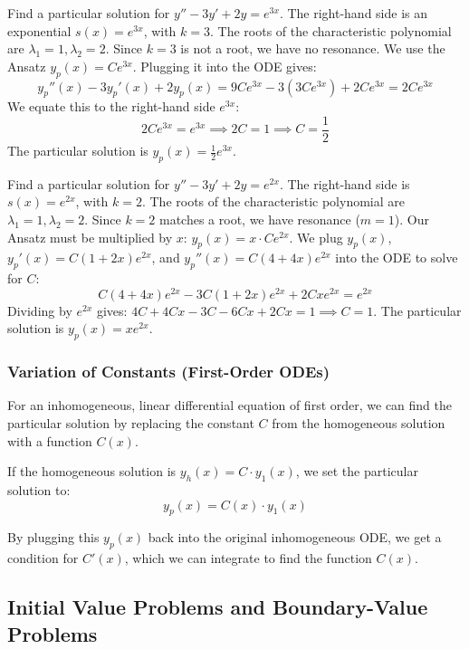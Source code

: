 \begin{example}
    Find a particular solution for $y'' - 3y' + 2y = e^{3x}$.
    The right-hand side is an exponential $s(x) = e^{3x}$, with $k=3$.
    The roots of the characteristic polynomial are $\lambda_1=1, \lambda_2=2$. Since $k=3$ is not a root, we have no resonance.
    We use the Ansatz $y_p(x) = C e^{3x}$.
    Plugging it into the ODE gives:
    $$y_p''(x) - 3y_p'(x) + 2y_p(x) = 9Ce^{3x} - 3(3Ce^{3x}) + 2Ce^{3x} = 2Ce^{3x}$$
    We equate this to the right-hand side $e^{3x}$:
    $$2Ce^{3x} = e^{3x} \implies 2C = 1 \implies C = \frac{1}{2}$$
    The particular solution is $y_p(x) = \frac{1}{2} e^{3x}$.
\end{example}

\begin{example}[Resonance]
    Find a particular solution for $y'' - 3y' + 2y = e^{2x}$.
    The right-hand side is $s(x) = e^{2x}$, with $k=2$.
    The roots of the characteristic polynomial are $\lambda_1=1, \lambda_2=2$. Since $k=2$ matches a root, we have resonance ($m=1$).
    Our Ansatz must be multiplied by $x$: $y_p(x) = x \cdot C e^{2x}$.
    We plug $y_p(x)$, $y_p'(x) = C(1+2x)e^{2x}$, and $y_p''(x) = C(4+4x)e^{2x}$ into the ODE to solve for $C$:
    $$C(4+4x)e^{2x} - 3C(1+2x)e^{2x} + 2Cx e^{2x} = e^{2x}$$
    Dividing by $e^{2x}$ gives: $4C + 4Cx - 3C - 6Cx + 2Cx = 1 \implies C = 1$.
    The particular solution is $y_p(x) = x e^{2x}$.
\end{example}

\subsubsection{Variation of Constants (First-Order ODEs)}

\begin{theorem}
    For an inhomogeneous, linear differential equation of first order, we can find the particular solution by replacing the constant $C$ from the homogeneous solution with a function $C(x)$.
    
    If the homogeneous solution is $y_h(x) = C \cdot y_1(x)$, we set the particular solution to:
    $$y_p(x) = C(x) \cdot y_1(x)$$
    
    By plugging this $y_p(x)$ back into the original inhomogeneous ODE, we get a condition for $C'(x)$, which we can integrate to find the function $C(x)$.
\end{theorem}


\subsection{Initial Value Problems and Boundary-Value Problems}

